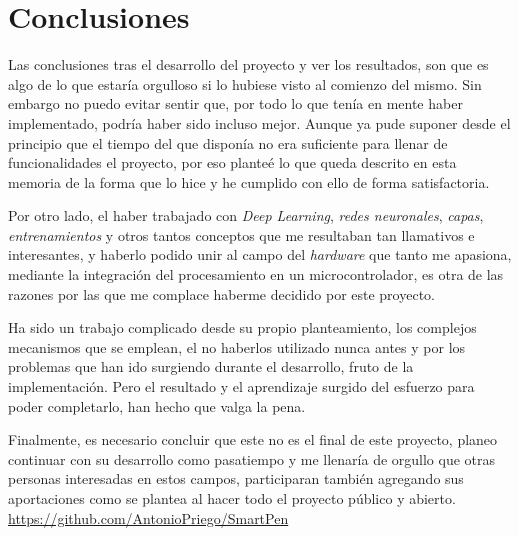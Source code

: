 \chapter{Conclusiones}
Las conclusiones tras el desarrollo del proyecto y ver los resultados, son que
es algo de lo que estaría orgulloso si lo hubiese visto al comienzo del mismo.
Sin embargo no puedo evitar sentir que, por todo lo que tenía en mente
haber implementado, podría haber sido incluso mejor. Aunque ya pude suponer
desde el principio que el tiempo del que disponía no era suficiente para llenar
de funcionalidades el proyecto, por eso planteé lo que queda descrito en esta
memoria de la forma que lo hice y he cumplido con ello de forma satisfactoria.

Por otro lado, el haber trabajado con \textit{Deep Learning}, \textit{redes neuronales},
\textit{capas}, \textit{entrenamientos} y otros tantos conceptos que me resultaban tan llamativos
e interesantes, y haberlo podido unir al campo del \textit{hardware} que tanto
me apasiona, mediante la integración del procesamiento en un microcontrolador,
es otra de las razones por las que me complace haberme decidido por este proyecto.

Ha sido un trabajo complicado desde su propio planteamiento, los complejos mecanismos
que se emplean, el no haberlos utilizado nunca antes y por los problemas
que han ido surgiendo durante el desarrollo, fruto de la implementación.
Pero el resultado y el aprendizaje surgido del esfuerzo para poder completarlo,
han hecho que valga la pena.

Finalmente, es necesario concluir que este no es el final de este proyecto,
planeo continuar con su desarrollo como pasatiempo y me llenaría de orgullo
que otras personas interesadas en estos campos, participaran también
agregando sus aportaciones como se plantea al hacer todo el proyecto
público y abierto.
\newline\newline
\url{https://github.com/AntonioPriego/SmartPen}